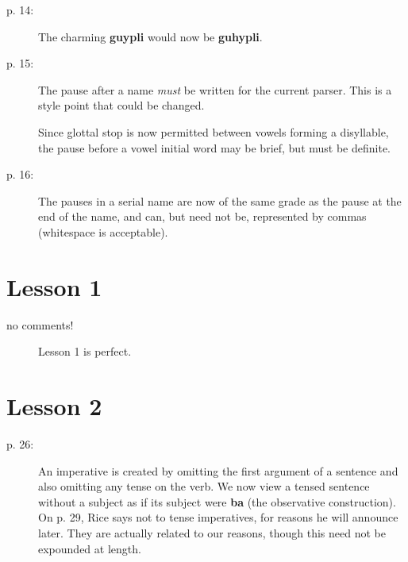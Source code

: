 \documentclass[12pt]{article}
\begin{document}
\begin{description}
\item[p. 14:]  The charming {\bf guypli} would now be {\bf guhypli}.

\item[p. 15:]  The pause after a name {\em must\/} be written for the current parser.  This is a style point that could be changed.

Since glottal stop is now permitted between vowels forming a disyllable, the pause before a vowel initial word may be brief, but must be definite.

\item[p. 16:]  The pauses in a serial name are now of the same grade as the pause at the end of the name, and can, but need not be, represented by commas (whitespace is acceptable).

\end{description}

\section{Lesson 1}

\begin{description}

\item[no comments!]  Lesson 1 is perfect.

\end{description}

\section{Lesson 2}

\begin{description}

\item[p. 26:]  An imperative is created by omitting the first argument of a sentence and also omitting any tense on the verb.  We now view a tensed sentence without a subject as if its subject were {\bf ba} (the observative construction).  On p. 29, Rice says not to tense imperatives, for reasons he will announce later.  They are actually related to our reasons, though this need not be expounded at length.

\end{description}
\end{document}
